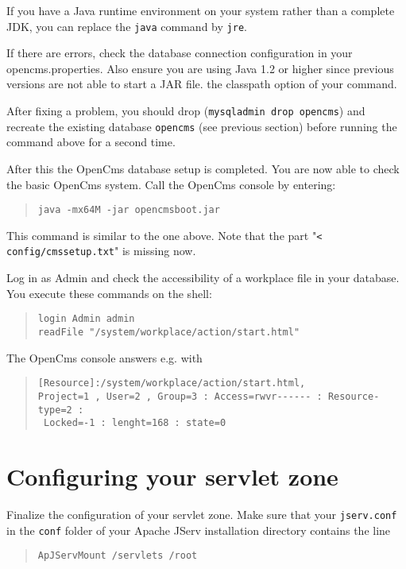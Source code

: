 If you have a Java runtime environment 
on your system rather than a complete JDK, you
can replace the \texttt{java} command by \texttt{jre}.

If there are errors, check the database connection configuration in your
opencms.properties. Also ensure you are using Java 1.2 or higher since
previous versions are not able to start a JAR file.
the classpath option of your command.

After fixing a problem, you should drop (\texttt{mysqladmin drop opencms}) and recreate 
the existing database \texttt{opencms} (see previous section) before 
running the command above for a second time.

After this the OpenCms database setup is completed. You are now able to check the basic OpenCms system. 
Call the OpenCms console by entering:

\begin{quote}
\texttt{java -mx64M -jar opencmsboot.jar}
\end{quote}

This command is similar to the one above.
Note that the part "\texttt{< config/cmssetup.txt}" is missing now.

Log in as Admin and check the accessibility of a workplace file in your database. 
You execute these commands on the shell: 

\begin{quote}
\texttt{login Admin admin\\
readFile "/system/workplace/action/start.html"}
\end{quote}

The OpenCms console answers e.g. with

\begin{quote}
\begin{verbatim}
[Resource]:/system/workplace/action/start.html,
Project=1 , User=2 , Group=3 : Access=rwvr------ : Resource-type=2 : 
 Locked=-1 : lenght=168 : state=0
\end{verbatim}
\end{quote}

\section{Configuring your servlet zone}
Finalize the configuration of your servlet zone. Make sure that your \texttt{jserv.conf} in 
the \texttt{conf} folder of your Apache JServ installation directory contains the line

\begin{quote}
\begin{verbatim}
ApJServMount /servlets /root
\end{verbatim}
\end{quote}

